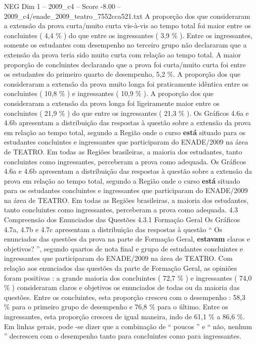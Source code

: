 \begin{textsample}{NEG Dim 1 – 2009\_c4 – Score -8.00 – 2009\_c4/enade\_2009\_teatro\_7552cca521.txt}
A proporção dos que consideraram a extensão da prova curta/muito curta vis-à-vis ao tempo total foi maior entre os concluintes ( 4,4 \% ) do que entre os ingressantes ( 3,9 \% ).
Entre os ingressantes, somente os estudantes com desempenho no terceiro grupo não declararam que a extensão da prova teria sido muito curta com relação ao tempo total.
A maior proporção de concluintes declarando que a prova foi curta/muito curta foi entre os estudantes do primeiro quarto de desempenho, 5,2 \%.
A proporção dos que consideraram a extensão da prova muito longa foi praticamente idêntica entre os concluintes ( 10,8 \% ) e ingressantes ( 10,9 \% ).
A proporção dos que consideraram a extensão da prova longa foi ligeiramente maior entre os concluintes ( 21,9 \% ) do que entre os ingressantes ( 21,3 \% ).
Os Gráficos 4.6a e 4.6b apresentam a distribuição das respostas à questão sobre a extensão da prova em relação ao tempo total, segundo a Região onde o curso \textbf{está} situado para os estudantes concluintes e ingressantes que participaram do ENADE/2009 na área de TEATRO.
Em todas as Regiões brasileiras, a maioria dos estudantes, tanto concluintes como ingressantes, perceberam a prova como adequada.
Os Gráficos 4.6a e 4.6b apresentam a distribuição das respostas à questão sobre a extensão da prova em relação ao tempo total, segundo a Região onde o curso \textbf{está} situado para os estudantes concluintes e ingressantes que participaram do ENADE/2009 na área de TEATRO.
Em todas as Regiões brasileiras, a maioria dos estudantes, tanto concluintes como ingressantes, perceberam a prova como adequada. 4.3 Compreensão dos Enunciados das Questões 4.3.1 Formação Geral Os Gráficos 4.7a, 4.7b e 4.7c apresentam a distribuição das respostas à questão “ Os enunciados das questões da prova na parte de Formação Geral, \textbf{estavam} claros e objetivos? ”, segundo quartos de nota final e grupo de estudantes concluintes e ingressantes que participaram do ENADE/2009 na área de TEATRO.
Com relação aos enunciados das questões da parte de Formação Geral, as opiniões foram positivas : a grande maioria dos concluintes ( 72,7 \% ) e ingressantes ( 74,0 \% ) consideraram claros e objetivos os enunciados de todas ou da maioria das questões.
Entre os concluintes, esta proporção cresceu com o desempenho : 58,3 \% para o primeiro grupo de desempenho e 76,8 \% para o último.
Entre os ingressantes, esta proporção cresceu de igual maneira, indo de 61,1 \% a 86,6 \%.
Em linhas gerais, pode -se dizer que a combinação de “ poucos ” e “ não, nenhum ” decresceu com o desempenho tanto para concluintes como para ingressantes.

\end{textsample}
